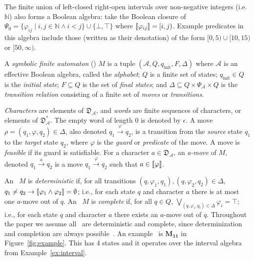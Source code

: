 \begin{example}
\label{ex:interval}
    The finite union of left-closed right-open intervals over 
    non-negative integers (i.e. $\mathbb{N}$) also forms a Boolean algebra:
    take the Boolean closure of
    $\Psi_0 = \{\varphi_{ij} \mid i,j \in \mathbb{N} \land i < j\} \cup \{\bot, \top\}$
    where $\llbracket {\varphi_{ij}} \rrbracket = [i, j)$.
    Example predicates in this algebra include those
    (written as their denotation) of the form
    $[0,5) \cup [10,15)$ or $[50,\infty)$.
\end{example}


\begin{definition}
A \emph{symbolic finite automaton} (\SFA) $M$
is a tuple $(\mathcal{A}, Q, q_\text{init}, F, \Delta)$ where
$\mathcal{A}$ is an effective Boolean algebra, called the \emph{alphabet};
$Q$ is a finite set of states;
$q_\text{init} \in Q$ is the \emph{initial state};
$F \subseteq Q$ is the set of \emph{final states};
and $\Delta \subseteq Q \times \Psi_\mathcal{A} \times Q$
is the \emph{transition relation} consisting of
a finite set of \emph{moves} or \emph{transitions}.
\end{definition}
%
\emph{Characters} are elements of $\mathfrak{D}_\mathcal{A}$,
and \emph{words} are finite sequences of characters,
or elements of $\mathfrak{D}_\mathcal{A}^*$.
The empty word of length 0 is denoted by $\epsilon$.
A move $\rho = (q_1, \varphi, q_2) \in \Delta$,
also denoted $q_1 \xrightarrow{\varphi} q_2$,
is a transition from the \emph{source} state $q_1$
to the \emph{target} state $q_2$,
where $\varphi$ is the \emph{guard} or \emph{predicate} of the move.
A move is \emph{feasible} if its guard is satisfiable.
%
For a character $a \in \mathfrak{D}_\mathcal{A}$, 
an \emph{a-move} of $M$, denoted $q_1 \xrightarrow{a} q_2$
is a move $q_1 \xrightarrow{\varphi} q_2$
such that $a \in \llbracket {\varphi} \rrbracket$.

An \SFA\ $M$ is \emph{deterministic} if, for all transitions
$(q, \varphi_1, q_1), (q, \varphi_2, q_2) \in \Delta$,
$q_1 \neq q_2 \rightarrow \llbracket {\varphi_1 \wedge \varphi_2} \rrbracket = \emptyset$;
i.e., for each state $q$ and character $a$ there is at most one $a$-move
out of $q$.
An \SFA\ $M$ is \emph{complete} if, for all $q \in Q$,
$\bigvee_{(q, \varphi_i, q_i) \in \Delta} \varphi_i = \top$;
i.e., for each state $q$ and character $a$ there exists an $a$-move
out of $q$.
Throughout the paper we assume all \SFAs\ are
deterministic and complete, since
determinization and completion are always possible~\cite{dantoni14}.
An example \SFA\ is $\mathbf{M_{11}}$ in Figure~\ref{fig:example}.
This {\SFA} has 4 states and it operates over the interval algebra from Example~\ref{ex:interval}.

